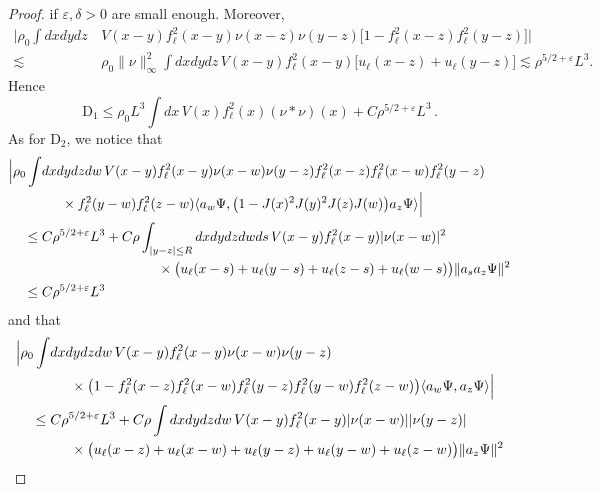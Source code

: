 \documentclass[a4paper,11pt]{article}
\def\eps{\varepsilon}
\numberwithin{equation}{section}
\begin{document}
\begin{proof}
if $\eps , \delta > 0$ are small enough. Moreover,
\begin{equation*}
    \begin{split}
        \bigg|\rho_0\int dxdydz\,& V(x-y) f_\ell^2(x-y) \nu(x-z)\nu(y-z)\big[ 1-f_\ell^2(x-z) f_\ell^2(y-z) \big]\bigg|\\
        \lesssim\;& \rho_0 \|\nu\|_\infty^2 \int dxdydz\,V(x-y) f_\ell^2(x-y) \big[ u_\ell (x-z) + u_\ell (y-z)\big] \lesssim \rho^{5/2+\varepsilon} L^3.
    \end{split}
\end{equation*}
Hence
\begin{equation} \label{eq:D1-bd} \text{D}_1 \leq \rho_0 L^3 \int dx \, V(x) f_\ell^2 (x) (\nu * \nu) (x) + C \rho^{5/2+\eps} L^3 \, .\end{equation} 
As for $\text{D}_2$, we notice that 
 \[  \begin{split} \Big| \rho_0 \int &dx dy dz dw \, V(x-y) f_\ell^2 (x-y) \nu (x-w) \nu (y-z) f_\ell^2 (x-z) f_\ell^2 (x-w) f_\ell^2 (y-z) \\ &\hspace{.5cm} \times f_\ell^2 (y-w) f_\ell^2 (z-w) \langle a_w \Psi, \big( 1 - J(x)^2 J(y)^2 J(z) J(w) \big) a_z \Psi \rangle \Big| \\ \leq \; &C \rho^{5/2+\eps} L^3 + C \rho \int_{|y-z| \leq R}  dx dy dz dw ds \, V(x-y)f_\ell^2(x-y) |\nu (x-w)|^2  \\ &\hspace{3cm} \times \big( u_\ell (x-s) + u_\ell (y-s) + u_\ell (z-s) + u_\ell (w-s) \big) \| a_s a_z \Psi \|^2 
 \\ \leq \; &C \rho^{5/2+\eps} L^3 
  \end{split} \]
  and that 
  \[ \begin{split} \Big| \rho_0 \int &dx dy dz dw \, V(x-y) f_\ell^2 (x-y) \nu (x-w) \nu (y-z)  \\ &\hspace{.5cm} \times \big( 1 - f_\ell^2 (x-z) f_\ell^2 (x-w) f_\ell^2 (y-z) f_\ell^2 (y-w) f_\ell^2 (z-w) \big)  \langle a_w \Psi, a_z \Psi \rangle \Big| \\ \leq \; &C \rho^{5/2+\eps} L^3 + C \rho \int  dx dy dz dw \, V(x-y) f_\ell^2(x-y)|\nu (x-w)| |\nu (y-z)|   \\ &\hspace{.5cm} \times \big( u_\ell (x-z) + u_\ell (x-w) + u_\ell (y-z) + u_\ell (y-w) + u_\ell (z-w)  \big) \| a_z \Psi \|^2 

\end{split}\]
\end{proof}
\end{document}
